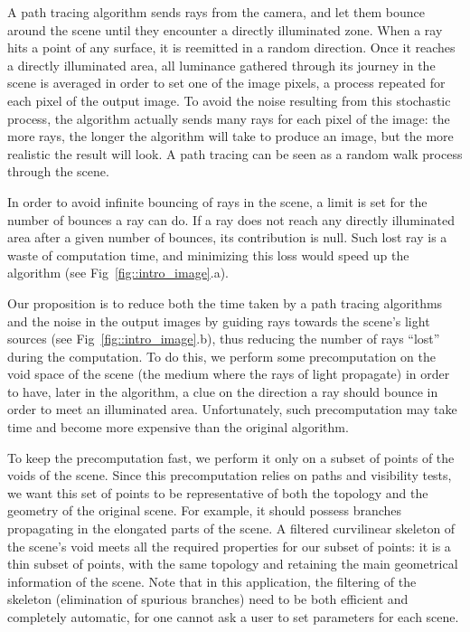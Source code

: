 \documentclass[final,envcountsame]{llncs}
\def\quotes#1{``#1''}
\begin{document}
A path tracing algorithm sends rays from the camera, and let them bounce around the scene until they encounter a directly illuminated zone. When a ray hits a point of any surface, it is reemitted in a random direction. Once it reaches a directly illuminated area, all luminance gathered through its journey in the scene is averaged in order to set one of the image pixels, a process repeated for each pixel of the output image. To avoid the noise resulting from this stochastic process, the algorithm actually sends many rays for each pixel of the image: the more rays, the longer the algorithm will take to produce an image, but the more realistic the result will look. A path tracing can be seen as a random walk process through the scene.

In order to avoid infinite bouncing of rays in the scene, a limit is set for the number of bounces a ray can do. If a ray does not reach any directly illuminated area after a given number of bounces, its contribution is null. Such lost ray is a waste of computation time, and minimizing this loss would speed up the algorithm (see Fig~\ref{fig::intro_image}.a).

Our proposition is to reduce both the time taken by a path tracing algorithms and the noise in the output images by guiding rays towards the scene's light sources (see Fig~\ref{fig::intro_image}.b), thus reducing the number of rays \quotes{lost} during the computation. To do this, we perform some precomputation on the void space of the scene (the medium where the rays of light propagate) in order to have, later in the algorithm, a clue on the direction a ray should bounce in order to meet an illuminated area. Unfortunately, such precomputation may take time and become more expensive than the original algorithm.

To keep the precomputation fast, we perform it only on a subset of points of the voids of the scene. Since this precomputation relies on paths and visibility tests, we want this set of points to be representative of both the topology and the geometry of the original scene. For example, it should possess branches propagating in the elongated parts of the scene. A filtered curvilinear skeleton of the scene's void meets all the required properties for our subset of points: it is a thin subset of points, with the same topology and retaining the main geometrical information of the scene. Note that in this application, the filtering of the skeleton (elimination of spurious branches) need to be both efficient and completely automatic, for one cannot ask a user to set parameters for each scene. 
\end{document}
